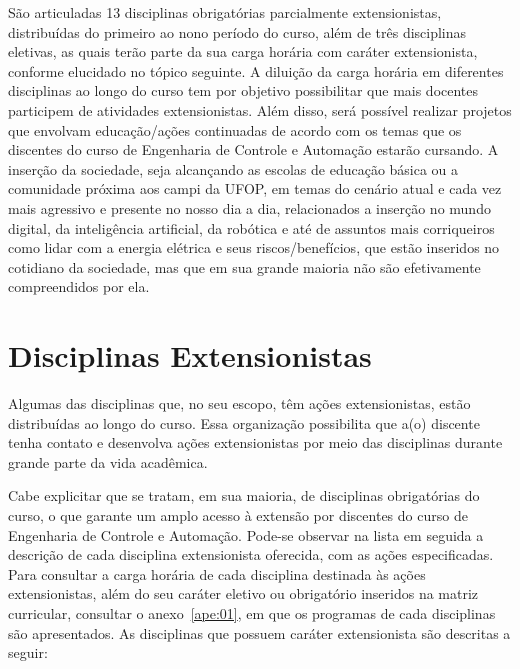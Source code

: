 \documentclass[
	12pt,				%
	openright,			%
	oneside,			%
	a4paper,			%
	english,			%
	brazil				%
	]{abntex2}
\begin{document}
São articuladas 13 disciplinas obrigatórias parcialmente extensionistas, distribuídas do primeiro ao nono período do curso, além de três disciplinas eletivas, as quais terão parte da sua carga horária com caráter extensionista, conforme elucidado no tópico seguinte. A diluição da carga horária em diferentes disciplinas ao longo do curso tem por objetivo possibilitar que mais docentes participem de atividades extensionistas. Além disso, será possível realizar projetos que envolvam educação/ações continuadas de acordo com os temas que os discentes do curso de Engenharia de Controle e Automação estarão cursando. A inserção da sociedade, seja alcançando as escolas de educação básica ou a comunidade próxima aos campi da UFOP, em temas do cenário atual e cada vez mais agressivo e presente no nosso dia a dia, relacionados a inserção no mundo digital, da inteligência artificial, da robótica e até de assuntos mais corriqueiros como lidar com a energia elétrica e seus riscos/benefícios, que estão inseridos no cotidiano da sociedade, mas que em sua grande maioria não são efetivamente compreendidos por ela.


\section{Disciplinas Extensionistas}
Algumas das disciplinas que, no seu escopo, têm ações extensionistas, estão distribuídas ao longo do curso. Essa organização possibilita que a(o) discente tenha contato e desenvolva ações extensionistas por meio das disciplinas durante grande parte da vida acadêmica.

Cabe explicitar que se tratam, em sua maioria, de disciplinas obrigatórias do curso, o que garante um amplo acesso à extensão por discentes do curso de Engenharia de Controle e Automação. Pode-se observar na lista em seguida a descrição de cada disciplina extensionista oferecida, com as ações especificadas. Para consultar a carga horária de cada disciplina destinada às ações extensionistas, além do seu caráter eletivo ou obrigatório inseridos na matriz curricular, consultar o anexo~\ref{ape:01}, em que os programas de cada disciplinas são apresentados. As disciplinas que possuem caráter extensionista são descritas a seguir:
\end{document}
